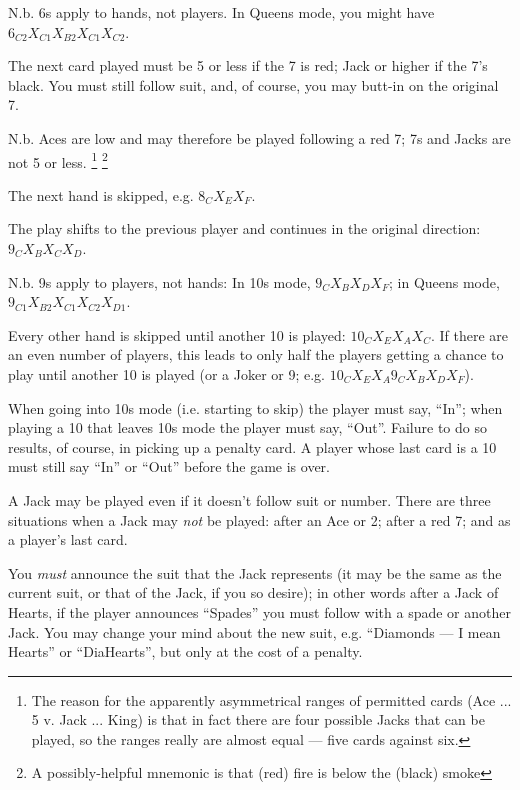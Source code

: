 \documentclass[12pt]{article}
\begin{document}
\begin{description}
    N.b. 6s apply to hands, not players.  In Queens mode, you might have $6_{C2} X_{C1} X_{B2} X_{C1} X_{C2}$.

  \item[\card{7}] The next card played must be 5 or less if the 7 is red; Jack or higher if the 7's black. You
    must still follow suit, and, of course, you may butt-in on the original 7.
    
    N.b. Aces are low and may therefore be played following a red 7; 7s and Jacks are not 5 or less.%
    \footnote{The reason for the apparently asymmetrical ranges of permitted cards (Ace ... 5 v. Jack ... King)
    is that in fact there are four possible Jacks that can be played, so the ranges really are almost
    equal --- five cards against six.}
    \footnote{A possibly-helpful mnemonic is that (red) fire is below the (black) smoke}

  \item[\card{8}]
    The next hand is skipped, e.g. $8_C X_E X_F$.

  \item[\card{9}]
    The play shifts to the previous player and continues in the original direction: $9_C X_B X_C X_D$.

    N.b. 9s apply to players, not hands: In 10s mode, $9_C X_B X_D X_F$;
    in Queens mode, $9_{C1} X_{B2} X_{C1} X_{C2} X_{D1}$.

  \item[\card{10}]
    Every other hand is skipped until another 10 is played: $10_C X_E X_A X_C$.  If there are an even number of
    players, this leads to only half the players getting a chance to play until another
    10 is played (or a Joker or 9; e.g.  $10_C X_E X_A 9_C X_B X_D X_F$).

    When going into 10s mode (i.e. starting to skip) the player must say, ``In''; when playing a
    10 that leaves 10s mode the player must say, ``Out''.  Failure to do so results, of course,
    in picking up a penalty card.  A player whose last card is a 10 must still say ``In'' or ``Out''
    before the game is over.

  \item[\card{Jack}]
    A Jack may be played even if it doesn't follow suit or number.  There are three situations
    when a Jack may \emph{not} be played:  after an Ace or 2; after a red 7; and as a player's last card.

    You \emph{must} announce the suit that the Jack represents (it may be the same as the
    current suit, or that of the Jack, if you so desire);  in other words after a Jack of
    Hearts, if the player announces ``Spades'' you must follow with a spade or another Jack.
    You may change your mind about the new suit, e.g. ``Diamonds --- I mean Hearts'' or ``DiaHearts'',
    but only at the cost of a penalty.


\end{description}
\end{document}

